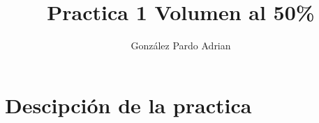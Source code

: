 \documentclass[11pt,a4paper]{article}
\author{González Pardo Adrian}
\title{Practica 1 Volumen al 50\%}
\begin{document}
  \maketitle
  \section{Descipción de la practica}
\end{document}
